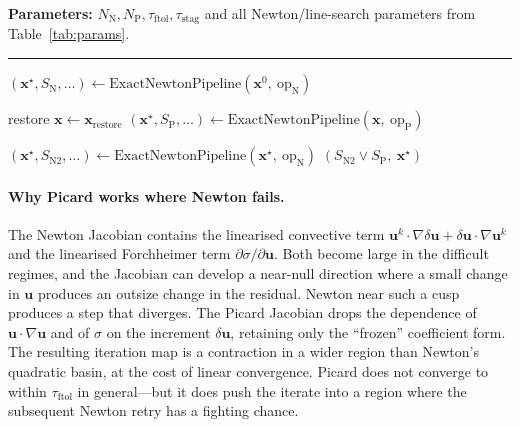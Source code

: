 \documentclass{article}
\newcommand{\textftol}{\tau_{\mathrm{ftol}}}
\newcommand{\textstag}{\tau_{\mathrm{stag}}}
\begin{document}
\begin{algorithm}[H]
\caption{$\mathrm{RobustNonlinearCascade}$: the Newton $\to$ Picard $\to$ Newton cascade. Stage I instantiates $\boldsymbol{x}_{\mathrm{restore}}$ with a backup copy of the initial guess; Algorithm~\ref{alg:C} instantiates it with the iterate at the start of the current outer staggered iteration.}
\label{alg:B}
\SetAlgoLined
\textbf{Parameters:} $N_{\mathrm{N}}, N_{\mathrm{P}}, \textftol, \textstag$ and all Newton/line-search parameters from Table~\ref{tab:params}.\\
\vspace{0.2cm}\hrule\vspace{0.2cm}
$(\boldsymbol{x}^\star, S_{\mathrm{N}}, \dots) \gets \mathrm{ExactNewtonPipeline}(\boldsymbol{x}^0,\ \mathrm{op}_{\mathrm{N}})$\;

restore $\boldsymbol{x} \gets \boldsymbol{x}_{\mathrm{restore}}$\;
$(\boldsymbol{x}^\star, S_{\mathrm{P}}, \dots) \gets \mathrm{ExactNewtonPipeline}(\boldsymbol{x},\ \mathrm{op}_{\mathrm{P}})$\;

$(\boldsymbol{x}^\star, S_{\mathrm{N2}}, \dots) \gets \mathrm{ExactNewtonPipeline}(\boldsymbol{x}^\star,\ \mathrm{op}_{\mathrm{N}})$\;
\Return $(S_{\mathrm{N2}} \vee S_{\mathrm{P}},\ \boldsymbol{x}^\star)$\;
\end{algorithm}

\paragraph{Why Picard works where Newton fails.}  The Newton Jacobian
contains the linearised convective term
$\boldsymbol{u}^k \cdot \nabla \delta\boldsymbol{u} + \delta\boldsymbol{u} \cdot \nabla \boldsymbol{u}^k$
and the linearised Forchheimer term
$\partial\sigma/\partial\boldsymbol{u}$. Both become large in the
difficult regimes, and the Jacobian can develop a near-null direction
where a small change in $\boldsymbol{u}$ produces an outsize change in
the residual. Newton near such a cusp produces a step that diverges.
The Picard Jacobian drops the dependence of
$\boldsymbol{u}\cdot\nabla\boldsymbol{u}$ and of $\sigma$ on the
increment $\delta\boldsymbol{u}$, retaining only the ``frozen''
coefficient form. The resulting iteration map is a contraction in a
wider region than Newton's quadratic basin, at the cost of linear
convergence. Picard does not converge to within $\textftol$ in
general---but it does push the iterate into a region where the
subsequent Newton retry has a fighting chance.
\end{document}
